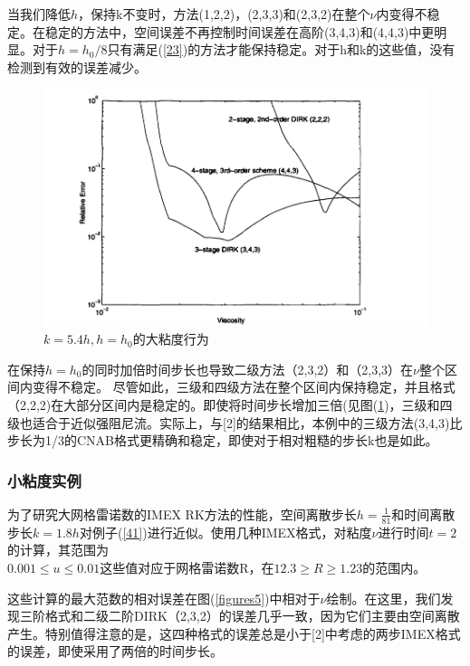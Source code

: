 \documentclass[12pt,a4paper]{article}
\begin{document}
当我们降低$h$，保持k不变时，方法(1,2,2)，(2,3,3)和(2,3,2)在整个$\nu $内变得不稳定。在稳定的方法中，空间误差不再控制时间误差在高阶(3,4,3)和(4,4,3)中更明显。对于$h=h_{0}/8$只有满足(\ref{23})的方法才能保持稳定。对于h和k的这些值，没有检测到有效的误差减少。
\begin{figure}[H]
\includegraphics[width=15cm]{./figures/4.png}
\caption{$k=5.4h,h=h_{0}$的大粘度行为}
\centering
\label{figures4}
\end{figure}

在保持$h=h_{0}$的同时加倍时间步长也导致二级方法（2,3,2）和（2,3,3）在$\nu$整个区间内变得不稳定。 尽管如此，三级和四级方法在整个区间内保持稳定，并且格式（2,2,2)在大部分区间内是稳定的。即使将时间步长增加三倍(见图(\ref{figures4})，三级和四级也适合于近似强阻尼流。实际上，与[2]的结果相比，本例中的三级方法(3,4,3)比步长为1/3的CNAB格式更精确和稳定，即使对于相对粗糙的步长k也是如此。

\subsubsection{小粘度实例}

为了研究大网格雷诺数的IMEX RK方法的性能，空间离散步长$h=\frac{1}{81}$和时间离散步长$k=1.8h$对例子(\ref{41})进行近似。使用几种IMEX格式，对粘度$\nu $进行时间$t = 2$的计算，其范围为\\$0.001\le u\le 0.01$这些值对应于网格雷诺数R，在$12.3\ge R \ge 1.23$的范围内。

这些计算的最大范数的相对误差在图(\ref{figures5})中相对于$\nu$绘制。在这里，我们发现三阶格式和二级二阶DIRK（2,3,2）的误差几乎一致，因为它们主要由空间离散产生。特别值得注意的是，这四种格式的误差总是小于[2]中考虑的两步IMEX格式的误差，即使采用了两倍的时间步长。
\end{document}
